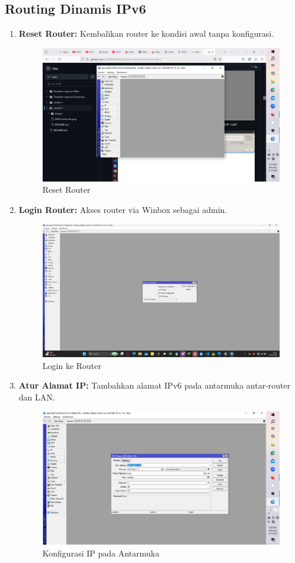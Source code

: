 \subsection{Routing Dinamis IPv6}
\begin{enumerate}
    \item \textbf{Reset Router:} Kembalikan router ke kondisi awal tanpa konfigurasi.
    \begin{figure}[H]
        \centering
        \includegraphics[width=0.5\linewidth]{P2/img/gambar1.png}
        \caption{Reset Router}
        \label{fig:gambar1}
    \end{figure}

    \item \textbf{Login Router:} Akses router via Winbox sebagai admin.
    \begin{figure}[H]
        \centering
        \includegraphics[width=0.5\linewidth]{P2/img/1 (4).jpg}
        \caption{Login ke Router}
        \label{fig:gambar2}
    \end{figure}

    \item \textbf{Atur Alamat IP:} Tambahkan alamat IPv6 pada antarmuka antar-router dan LAN.
    \begin{figure}[H]
        \centering
        \includegraphics[width=0.5\linewidth]{P2/img/gambar3.png}
        \caption{Konfigurasi IP pada Antarmuka}
        \label{fig:gambar3}
    \end{figure}


\end{enumerate}
